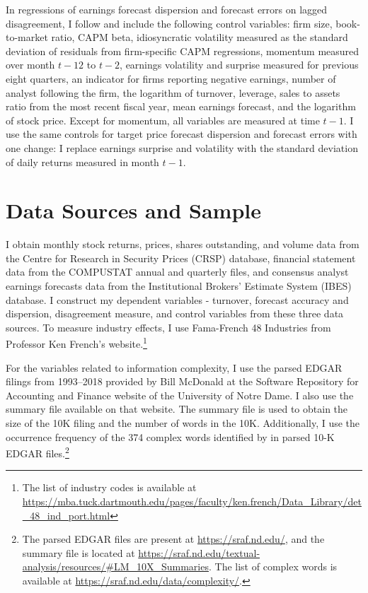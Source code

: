 \documentclass[
  12pt,
  a4paper,
  twoside,
  onecolumn]{article}
\begin{document}
In regressions of earnings forecast dispersion and forecast errors on
lagged disagreement, I follow \cite{liu_etal2012} and include the
following control variables: firm size, book-to-market ratio, CAPM beta,
idiosyncratic volatility measured as the standard deviation of residuals
from firm-specific CAPM regressions, momentum measured over month
\(t-12\) to \(t-2\), earnings volatility and surprise measured for
previous eight quarters, an indicator for firms reporting negative
earnings, number of analyst following the firm, the logarithm of
turnover, leverage, sales to assets ratio from the most recent fiscal
year, mean earnings forecast, and the logarithm of stock price. Except
for momentum, all variables are measured at time \(t-1\). I use the same
controls for target price forecast dispersion and forecast errors with
one change: I replace earnings surprise and volatility with the standard
deviation of daily returns measured in month \(t-1\).

\hypertarget{sec:data}{%
\section{Data Sources and Sample}\label{sec:data}}

I obtain monthly stock returns, prices, shares outstanding, and volume
data from the Centre for Research in Security Prices (CRSP) database,
financial statement data from the COMPUSTAT annual and quarterly files,
and consensus analyst earnings forecasts data from the Institutional
Brokers' Estimate System (IBES) database. I construct my dependent
variables - turnover, forecast accuracy and dispersion, disagreement
measure, and control variables from these three data sources. To measure
industry effects, I use Fama-French 48 Industries from Professor Ken
French's website.\footnote{The list of industry codes is available at
  \url{https://mba.tuck.dartmouth.edu/pages/faculty/ken.french/Data_Library/det_48_ind_port.html}}

For the variables related to information complexity, I use the parsed
EDGAR filings from 1993--2018 provided by Bill McDonald at the Software
Repository for Accounting and Finance website of the University of Notre
Dame. I also use the summary file available on that website. The summary
file is used to obtain the size of the 10K filing and the number of
words in the 10K. Additionally, I use the occurrence frequency of the
374 complex words identified by \cite{lm_2020_firm_complexity} in parsed
10-K EDGAR files.\footnote{The parsed EDGAR files are present at
  \url{https://sraf.nd.edu/}, and the summary file is located at
  \url{https://sraf.nd.edu/textual-analysis/resources/\#LM_10X_Summaries}.
  The list of complex words is available at
  \url{https://sraf.nd.edu/data/complexity/}.}
\end{document}
